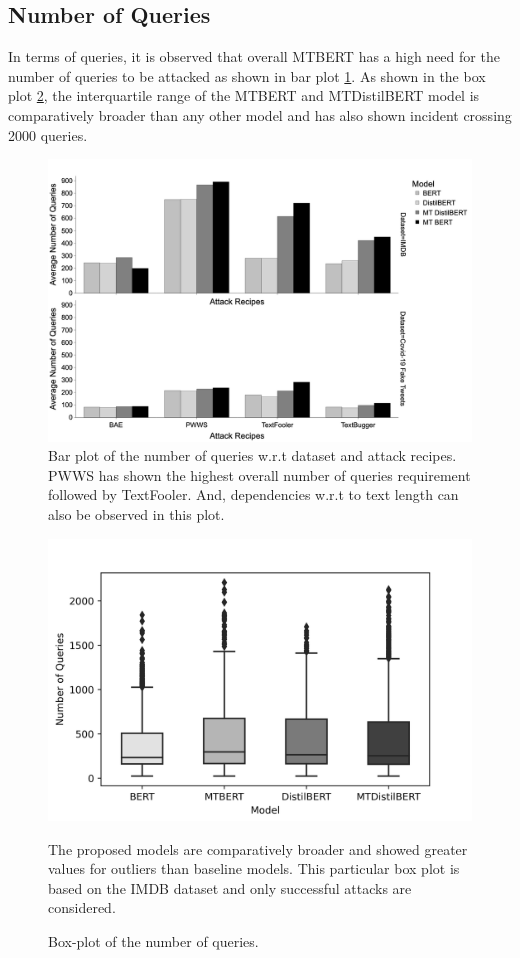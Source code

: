 \documentclass[%
	BCOR=8mm, %
	DIV=12,
	toc=bibliography, %
	toc=listof, %
	oneside, %
	egregdoesnotlikesansseriftitles, %
	]{scrbook}
\begin{document}
\subsection{Number of Queries}
In terms of queries, it is observed that overall MTBERT has a high need for the number of queries to be attacked as shown in bar plot \ref{fig:avgnquebyattackrecipes}. As shown in the box plot \ref{fig:numofqueriesdist}, the interquartile range of the MTBERT and MTDistilBERT model is comparatively broader than any other model and has also shown incident crossing 2000 queries. 
\begin{figure}[H]
	\centering
     \hspace*{2.5em}
    \includegraphics[width=.95\linewidth]{img/AvgNQuebyDataset}
	\caption[Bar plot of the number of queries]{Bar plot of the number of queries w.r.t dataset and attack recipes. PWWS has shown the highest overall number of queries requirement followed by TextFooler.  And, dependencies w.r.t to text length can also be observed in this plot.}
	\label{fig:avgnquebyattackrecipes}
\end{figure}
\begin{figure}[H]
    \centering
    \includegraphics[width=0.75\linewidth]{img/NumQueriesDist_IMDB.png}
    \caption{Box-plot of the number of queries.}{ The proposed models are comparatively broader and showed greater values for outliers than baseline models. This particular box plot is based on the IMDB dataset and only successful attacks are considered.}
    \label{fig:numofqueriesdist}
\end{figure}
\end{document}
